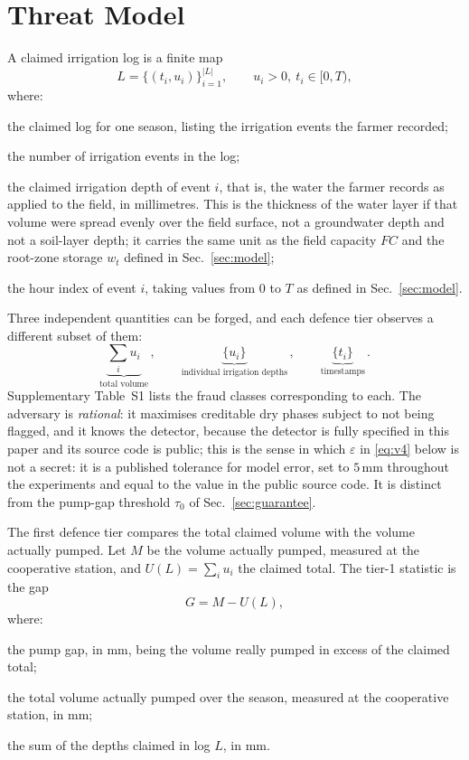 \section{Threat Model}
\label{sec:threat}

A claimed irrigation log is a finite map
\begin{equation}
L=\{(t_i,u_i)\}_{i=1}^{|L|},\qquad u_i>0,\ t_i\in[0,T),
\label{eq:log}
\end{equation}
where:
\begin{symbolist}
\item[$L$] the claimed log for one season, listing the irrigation events the farmer
  recorded;
\item[$|L|$] the number of irrigation events in the log;
\item[$u_i$] the claimed irrigation depth of event $i$, that is, the water the farmer
  records as applied to the field, in millimetres. This is the thickness of the water
  layer if that volume were spread evenly over the field surface, not a groundwater
  depth and not a soil-layer depth; it carries the same unit as the field capacity
  $FC$ and the root-zone storage $w_t$ defined in Sec.~\ref{sec:model};
\item[$t_i$] the hour index of event $i$, taking values from 0 to $T$ as defined in
  Sec.~\ref{sec:model}.
\end{symbolist} Three
independent quantities can be forged, and each defence tier observes a different
subset of them:
\begin{equation}
\underbrace{\textstyle\sum_i u_i}_{\text{total volume}}\,,\qquad
\underbrace{\{u_i\}}_{\text{individual irrigation depths}}\,,\qquad
\underbrace{\{t_i\}}_{\text{timestamps}}\,.
\label{eq:three}
\end{equation}
Supplementary Table~S1 lists the fraud classes corresponding to each. The adversary is
\emph{rational}: it maximises creditable dry phases subject to not being
flagged, and it knows the detector, because the detector is fully specified in this paper
and its source code is public; this is the sense in which $\varepsilon$ in \eqref{eq:v4} below is not a secret: it
is a published tolerance for model error, set to $5$\,mm throughout the experiments
and equal to the value in the public source code. It is distinct from the pump-gap
threshold $\tau_0$ of Sec.~\ref{sec:guarantee}.

The first defence tier compares the total claimed volume with the volume actually
pumped. Let $M$ be the volume actually pumped, measured at the cooperative station,
and $U(L)=\sum_i u_i$ the claimed total. The tier-1 statistic is the gap
\begin{equation}
G=M-U(L),
\label{eq:gap}
\end{equation}
where:
\begin{symbolist}
\item[$G$] the pump gap, in mm, being the volume really pumped in excess of the
  claimed total;
\item[$M$] the total volume actually pumped over the season, measured at the
  cooperative station, in mm;
\item[$U(L)$] the sum of the depths claimed in log $L$, in mm.
\end{symbolist}

